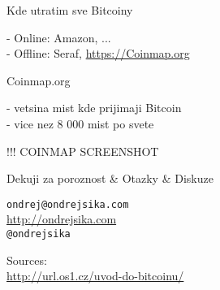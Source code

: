 \documentclass{beamer}
\begin{document}
\begin{frame}

    {\LARGE Kde utratim sve Bitcoiny}\\

    \vspace{5mm}

    - Online: Amazon, ...\\ %
    - Offline: Seraf, \url{https://Coinmap.org}\\

\end{frame}

\begin{frame}

    {\LARGE Coinmap.org}\\

    \vspace{5mm}

    - vetsina mist kde prijimaji Bitcoin\\
    - vice nez 8 000 mist po svete\\

    \vspace{5mm}

    !!! COINMAP SCREENSHOT %

\end{frame}

\begin{frame}

    {\LARGE Dekuji za poroznost \& Otazky \& Diskuze}\\

    \vspace{1cm}

    \texttt{ondrej@ondrejsika.com}\\
    \url{http://ondrejsika.com}\\
    \texttt{@ondrejsika}\\

    \vspace{1cm}

    Sources:\\
    \url{http://url.os1.cz/uvod-do-bitcoinu/}
\end{frame}
\end{document}

